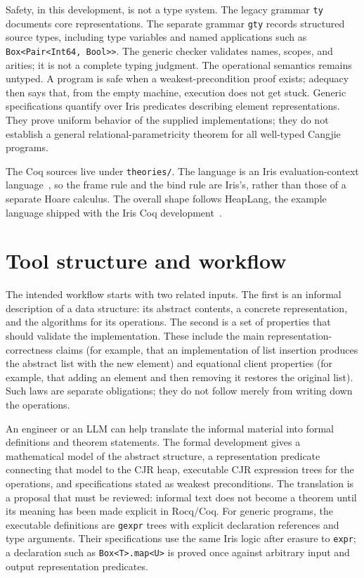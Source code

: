 \documentclass[11pt]{article}
\begin{document}
Safety, in this development, is not a type system.
The legacy grammar \texttt{ty} documents core representations. The separate
grammar \texttt{gty} records structured source types, including type variables
and named applications such as \texttt{Box<Pair<Int64, Bool>>}.
The generic checker validates names, scopes, and arities; it is not a complete
typing judgment. The operational semantics remains untyped.
A program is safe when a weakest-precondition proof exists; adequacy then says that, from the empty machine, execution does not get stuck.
Generic specifications quantify over Iris predicates describing element
representations. They prove uniform behavior of the supplied implementations;
they do not establish a general relational-parametricity theorem for all
well-typed Cangjie programs.

The Coq sources live under \texttt{theories/}.
The language is an Iris evaluation-context language~\cite{iris-ground-up,iris-essence}, so the frame rule and the bind rule are Iris's, rather than those of a separate Hoare calculus.
The overall shape follows HeapLang, the example language shipped with the Iris Coq development~\cite{iris-coq}.

\section{Tool structure and workflow}
\label{sec:tool-workflow}

The intended workflow starts with two related inputs.  The first is an
informal description of a data structure: its abstract contents, a concrete
representation, and the algorithms for its operations.  The second is a set
of properties that should validate the implementation.  These include the
main representation-correctness claims (for example, that an implementation
of list insertion produces the abstract list with the new element) and
equational client properties (for example, that adding an element and then
removing it restores the original list).  Such laws are separate obligations;
they do not follow merely from writing down the operations.

An engineer or an LLM can help translate the informal material into formal
definitions and theorem statements.  The formal development gives a
mathematical model of the abstract structure, a representation predicate
connecting that model to the CJR heap, executable CJR expression trees for
the operations, and specifications stated as weakest preconditions.  The
translation is a proposal that must be reviewed: informal text does not
become a theorem until its meaning has been made explicit in Rocq/Coq.
For generic programs, the executable definitions are \texttt{gexpr} trees
with explicit declaration references and type arguments. Their specifications
use the same Iris logic after erasure to \texttt{expr}; a declaration such as
\texttt{Box<T>.map<U>} is proved once against arbitrary input and output
representation predicates.
\end{document}
